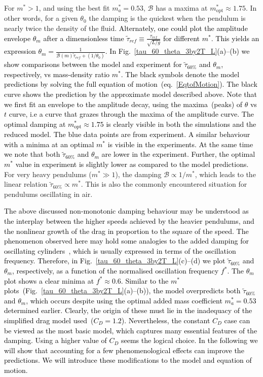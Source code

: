 \documentclass{jfm}
\begin{document}
{	%
For $m^* > 1$, and using the best fit $m_a^* =0.53$, $\mathcal{B}$ has a maxima at $m_{\text{opt}}^* \approx 1.75$. In other words, for a given $\theta_0$ the damping is the quickest when the pendulum is nearly twice the density of the fluid. \textcolor{black}{Alternately, one could plot the amplitude envelope $\theta_m$ after a dimensionless time $\tilde{{\tau}}_{ref} \equiv \frac{\tau_{ref}}{\sqrt{L/g}}$ for different $m^*$. This yields an expression $\theta_m = \frac{1}{\mathcal{B}(m) \tilde{\tau}_{ref}+  (1/\theta_0)}$. In Fig.~\ref{tau_60_theta_3by2T_L}(a)--(b) we show comparisons between the model and experiment for $\tilde{\tau}_{60\%}$ and $\theta_m$, respectively, vs mass-density ratio $m^*$.  The black symbols denote the model predictions by solving the full equation of motion~(eq.~\ref{EqtofMotion}). The black curve shows the prediction by the approximate model described above. Note that we first fit an envelope to the amplitude decay, using the maxima~(peaks) of $\theta$ vs $t$ curve, i.e a curve that grazes through the maxima of the amplitude curve. The optimal damping at $m^*_{\text{opt}} \approx 1.75$ is clearly visible in both the simulations and the reduced model. The blue data points are from experiment. A similar behaviour with a minima at an optimal $m^*$ is visible in the experiments. At the same time we note that both $\tilde{\tau}_{60\%}$ and $\theta_m$ are lower in the experiment. Further, the optimal $m^*$ value in experiment is slightly lower as compared to the model predictions.}  For very heavy pendulums ($m^* \gg 1$), the damping $\mathcal{B} \propto 1/m^*$, which leads to the linear relation $\tilde{\tau}_{60\%} \propto m^*$. This is also the commonly encountered situation for pendulums oscillating in air.

\textcolor{black}{The above discussed non-monotonic damping behaviour may be understood as the interplay between the higher speeds achieved by the heavier pendulums, and the nonlinear growth of the drag in proportion to the square of the speed.}
	\textcolor{black}{The phenomenon observed here may hold some analogies to the added damping for oscillating cylinders~\citep{dong1978effective}, which is usually expressed in terms of the oscillation frequency. Therefore, in Fig.~\ref{tau_60_theta_3by2T_L}(c)--(d)  we plot $\tilde{\tau}_{60\%}$ and $\theta_m$, respectively, as a function of the normalised oscillation frequency $f^*$. The $\theta_m$ plot shows a clear minima at $f^* \approx 0.6$. Similar to the $m^*$  plots~(Fig.~\ref{tau_60_theta_3by2T_L}(a)--(b)), the model overpredicts both $\tilde{\tau}_{60\%}$ and $\theta_m$, which occurs despite using the optimal added mass coefficient $m_a^* = 0.53$ determined earlier. Clearly, the origin of these must lie in the inadequacy of the simplified drag model used~($C_D =1.2$). Nevertheless, the constant $C_D$ case can be viewed as the most basic model, which captures many essential features of the damping. Using a higher value of $C_D$ seems the logical choice. In the following we will show that accounting for a few phenomenological effects can improve the predictions. We will introduce these modifications to the model and equation of motion.}
	

}
\end{document}
